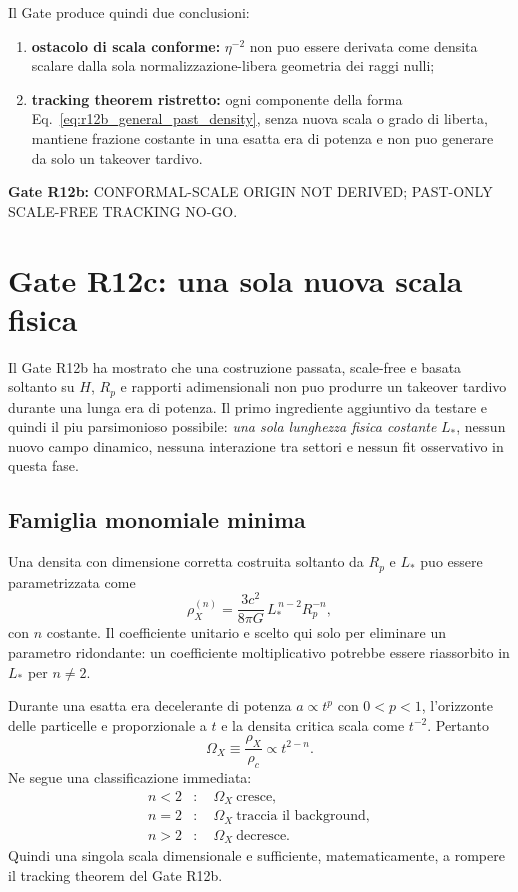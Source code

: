 \documentclass[11pt,a4paper]{article}
\newcommand{\status}[1]{\textsf{#1}}
\begin{document}
Il Gate produce quindi due conclusioni:
\begin{enumerate}
\item \textbf{ostacolo di scala conforme:} $\eta^{-2}$ non puo essere derivata come densita scalare dalla sola normalizzazione-libera geometria dei raggi nulli;
\item \textbf{tracking theorem ristretto:} ogni componente della forma Eq.~\eqref{eq:r12b_general_past_density}, senza nuova scala o grado di liberta, mantiene frazione costante in una esatta era di potenza e non puo generare da solo un takeover tardivo.
\end{enumerate}

\textbf{Gate R12b:} \status{CONFORMAL-SCALE ORIGIN NOT DERIVED; PAST-ONLY SCALE-FREE TRACKING NO-GO}.



\section{Gate R12c: una sola nuova scala fisica}

Il Gate R12b ha mostrato che una costruzione passata, scale-free e basata soltanto su $H$, $R_p$ e rapporti adimensionali non puo produrre un takeover tardivo durante una lunga era di potenza. Il primo ingrediente aggiuntivo da testare e quindi il piu parsimonioso possibile: \emph{una sola lunghezza fisica costante} $L_*$, nessun nuovo campo dinamico, nessuna interazione tra settori e nessun fit osservativo in questa fase.

\subsection{Famiglia monomiale minima}

Una densita con dimensione corretta costruita soltanto da $R_p$ e $L_*$ puo essere parametrizzata come
\begin{equation}
 \rho_X^{(n)}=
 \frac{3c^2}{8\pi G}\,
 L_*^{\,n-2}R_p^{-n},
 \label{eq:r12c_family}
\end{equation}
con $n$ costante. Il coefficiente unitario e scelto qui solo per eliminare un parametro ridondante: un coefficiente moltiplicativo potrebbe essere riassorbito in $L_*$ per $n\neq2$.

Durante una esatta era decelerante di potenza $a\propto t^p$ con $0<p<1$, l'orizzonte delle particelle e proporzionale a $t$ e la densita critica scala come $t^{-2}$. Pertanto
\begin{equation}
 \Omega_X\equiv\frac{\rho_X}{\rho_c}\propto t^{2-n}.
 \label{eq:r12c_tracking_break}
\end{equation}
Ne segue una classificazione immediata:
\begin{align}
 n<2 &: \quad \Omega_X\ \text{cresce},\\
 n=2 &: \quad \Omega_X\ \text{traccia il background},\\
 n>2 &: \quad \Omega_X\ \text{decresce}.
\end{align}
Quindi una singola scala dimensionale e sufficiente, matematicamente, a rompere il tracking theorem del Gate R12b.
\end{document}
